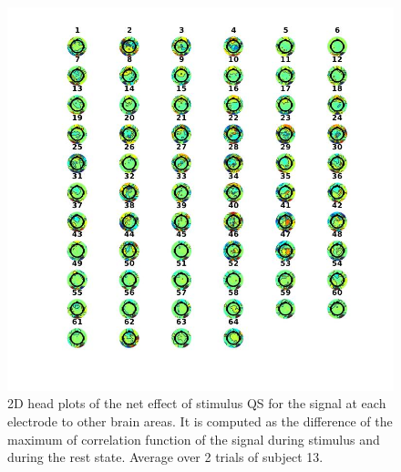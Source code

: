 \documentclass[a4paper]{article}
\begin{document}
\begin{figure}[H]
    \centering
    \includegraphics[width=16cm]{QS1.jpg}
    \caption{2D head plots of the net effect of stimulus QS for the signal at each electrode to other brain areas. It is computed as the difference of the maximum of correlation function of the signal during stimulus and during the rest state. Average over 2 trials of subject 13.}
    \label{fig:qs1}
\end{figure}
\end{document}
